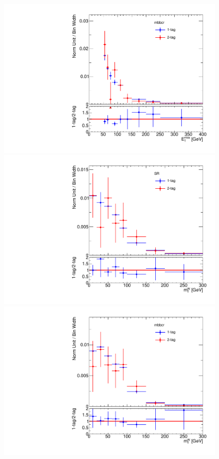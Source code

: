 \begin{figure}[!htbp]
\begin{center}
\includegraphics[scale=0.33]{./figures/boosted/ABCD/ABCD_2TagVs1Tag_mbbcr_lepton_MET}\\
\includegraphics[scale=0.33]{./figures/boosted/ABCD/ABCD_2TagVs1Tag_SR_lepton_WlepMtATLAS} 
\includegraphics[scale=0.33]{./figures/boosted/ABCD/ABCD_2TagVs1Tag_mbbcr_lepton_WlepMtATLAS}\\

\end{center}
\end{figure}
